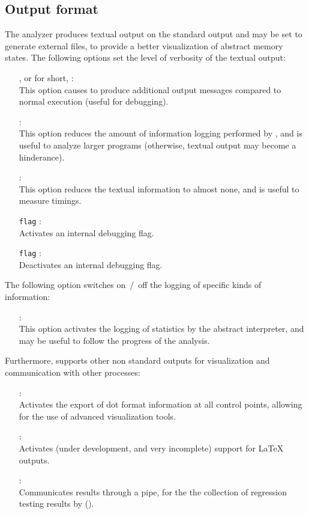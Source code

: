 \subsection{Output format}
\label{s:opt:out}
The \memcad analyzer produces textual output on the standard
output and may be set to generate external files, to provide a better
visualization of abstract memory states.
The following options set the level of verbosity of the textual output:
\begin{itemize}
\item[\doption{-verbose}, or for short, \doption{-v}]: \\
  This option causes \sanalyze to produce additional output
  messages compared to normal execution (useful for debugging).
\item[\doption{-silent}]: \\
  This option reduces the amount of information logging performed
  by \sanalyze, and is useful to analyze larger programs
  (otherwise, textual output may become a hinderance).
\item[\doption{-very-silent}]: \\
  This option reduces the textual information to almost none, and
  is useful to measure timings.
\item[\doption{-set-on} \texttt{flag}] \optdev: \\
  Activates an internal debugging flag.
\item[\doption{-set-off} \texttt{flag}] \optdev: \\
  Deactivates an internal debugging flag.
\end{itemize}
The following option switches on~/~off the logging of specific kinds
of information:
\begin{itemize}
\item[\doption{-stats}]: \\
  This option activates the logging of statistics by the abstract
  interpreter, and may be useful to follow the progress of the analysis.
\end{itemize}
Furthermore, \memcad supports other non standard outputs for visualization
and communication with other processes:
\begin{itemize}
\item[\doption{-dot-all}] \optadv: \\
  Activates the export of dot format information at all control points,
  allowing for the use of advanced visualization tools.
\item[\doption{-latex}] \optdev: \\
  Activates (under development, and very incomplete) support for LaTeX
  outputs.
\item[\doption{-pipe}] \optdev: \\
  Communicates results through a pipe, for the the collection of regression
  testing results by \sbatch ().
\end{itemize}

